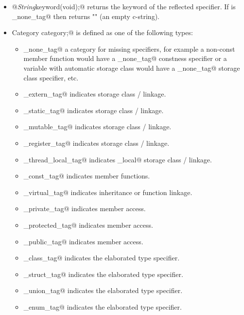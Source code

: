 \begin{itemize}

\item{\verb@static @{\em String}\verb@ keyword(void);@} returns the keyword
of the reflected specifier. If \verb@category@ is \verb@spec_none_tag@
then \verb@keyword@ returns "" (an empty c-string).

\item{\verb@typedef Category category;@} is defined as one of the following 
types:
	\begin{itemize}
		\item{\verb@spec_none_tag@} a category for missing specifiers,
		for example a non-const member function would have a \verb@spec_none_tag@
		constness specifier or a variable with automatic storage class
		would have a \verb@spec_none_tag@ storage class specifier, etc.

		\item{\verb@spec_extern_tag@} indicates \verb@extern@ storage class / linkage.
		\item{\verb@spec_static_tag@} indicates \verb@static@ storage class / linkage.
		\item{\verb@spec_mutable_tag@} indicates \verb@mutable@ storage class / linkage.
		\item{\verb@spec_register_tag@} indicates \verb@register@ storage class / linkage.
		\item{\verb@spec_thread_local_tag@} indicates \verb@thread_local@ storage class / linkage.

		\item{\verb@spec_const_tag@} indicates \verb@const@ member functions.

		\item{\verb@spec_virtual_tag@} indicates \verb@virtual@ inheritance or function linkage.

		\item{\verb@spec_private_tag@} indicates \verb@private@ member access.
		\item{\verb@spec_protected_tag@} indicates \verb@protected@ member access.
		\item{\verb@spec_public_tag@} indicates \verb@public@ member access.

		\item{\verb@spec_class_tag@} indicates the \verb@class@ elaborated type specifier.
		\item{\verb@spec_struct_tag@} indicates the \verb@struct@ elaborated type specifier.
		\item{\verb@spec_union_tag@} indicates the \verb@union@ elaborated type specifier.
		\item{\verb@spec_enum_tag@} indicates the \verb@enum@ elaborated type specifier.
	\end{itemize}
\end{itemize}

